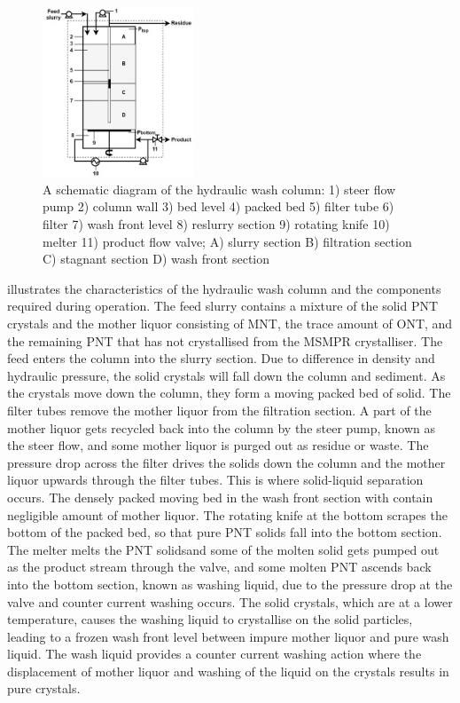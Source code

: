 \begin{figure}
\centering
\includegraphics[width=0.4\textwidth]{chapters/3-separation/figures/hydraulic.jpg}
\caption{A schematic diagram of the hydraulic wash column: 1) steer flow pump 2) column wall 3) bed level 4) packed bed 5) filter tube 6) filter 7) wash front level 8) reslurry section 9) rotating knife 10) melter 11) product flow valve; A) slurry section B) filtration section C) stagnant section D) wash front section \cite{van_oord-knol_hydraulic_2000}}
\label{fig:hydraulic}
\end{figure}

 illustrates the characteristics of the hydraulic wash column and the components required during operation. The feed slurry contains a mixture of the solid PNT crystals and the mother liquor consisting of MNT, the trace amount of ONT, and the remaining PNT that has not crystallised from the MSMPR crystalliser. The feed enters the column into the slurry section. Due to difference in density and hydraulic pressure, the solid crystals will fall down the column and sediment. As the crystals move down the column, they form a moving packed bed of solid. The filter tubes remove the mother liquor from the filtration section. A part of the mother liquor gets recycled back into the column by the steer pump, known as the steer flow, and some mother liquor is purged out as residue or waste. The pressure drop across the filter drives the solids down the column and the mother liquor upwards through the filter tubes. This is where solid-liquid separation occurs. The densely packed moving bed in the wash front section with contain negligible amount of mother liquor. The rotating knife at the bottom scrapes the bottom of the packed bed, so that pure PNT solids fall into the bottom section. The melter melts the PNT solidsand some of the molten solid gets pumped out as the product stream through the valve, and some molten PNT ascends back into the bottom section, known as washing liquid, due to the pressure drop at the valve and counter current washing occurs. The solid crystals, which are at a lower temperature, causes the washing liquid to crystallise on the solid particles, leading to a frozen wash front level between impure mother liquor and pure wash liquid. The wash liquid provides a counter current washing action where the displacement of mother liquor and washing of the liquid on the crystals results in pure crystals. 

